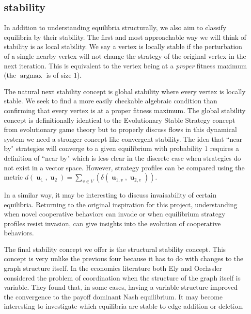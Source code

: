 \documentclass[]{article}
\DeclareMathOperator*{\argmax}{\text{argmax}}
\DeclareMathOperator{\uu}{\mathbf{u}}
\begin{document}
		\subsection{stability}\label{stability}
		In addition to understanding equilibria structurally, we also aim to classify equilibria by their stability. The first and most approachable way we will think of stability is as local stability. We say a vertex is locally stable if the perturbation of a single nearby vertex will not change the strategy of the original vertex in the next iteration. This is equivalent to the vertex being at a \textit{proper} fitness maximum (the $\argmax$ is of size 1). 
		
		The natural next stability concept is global stability where every vertex is locally stable. We seek to find a more easily checkable algebraic condition than confirming that every vertex is at a proper fitness maximum. The global stability concept is definitionally identical to the Evolutionary Stable Strategy concept from evolutionary game theory\cite{Apaloo2009,Nowak2006} but to properly discuss flows in this dynamical system we need a stronger concept like convergent stability. The idea that ``near by" strategies will converge to a given equilibrium with probability 1 requires a definition of ``near by" which is less clear in the discrete case when strategies do not exist in a vector space. However, strategy profiles can be compared using the metric $d(\uu_1,\uu_2)=\sum_{v\in V}(\delta(\uu_{1,v},\uu_{2,v}))$.
		
		In a similar way, it may be interesting to discuss invaisability of certain equilibria. Returning to the original inspiration for this project, understanding when novel cooperative behaviors can invade or when equilibrium strategy profiles resist invasion, can give insights into the evolution of cooperative behaviors.
		
		The final stability concept we offer is the structural stability concept. This concept is very unlike the previous four because it has to do with changes to the graph structure itself. In the economics literature both Ely and Oechssler considered the problem of coordination when the structure of the graph itself is variable. They found that, in some cases, having a variable structure improved the convergence to the payoff dominant Nash equilibrium\cite{Ely2002,Oechssler1999,Oechssler1997}. %
		It may become interesting to investigate which equilibria are stable to edge addition or deletion. 
		
\end{document}
